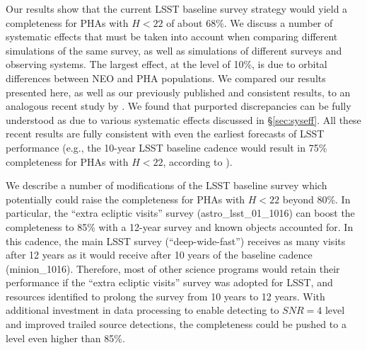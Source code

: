 Our results show that the current LSST baseline survey strategy would yield a completeness for PHAs
with $H<22$ of about 68\%. We discuss a number of systematic effects that must be taken into
account when comparing different simulations of the same survey, as well as simulations of different
surveys and observing systems. The largest effect, at the level of 10\%, is due to orbital differences
between NEO and PHA populations. We compared our results presented here, as well as our previously
published and consistent results, to an analogous recent study by \citet[]{GMS2016}. We found that
purported discrepancies can be fully understood as due to various systematic effects discussed in
\S\ref{sec:syseff}. All these recent results are fully consistent with even the earliest forecasts of LSST
performance (e.g., the 10-year LSST baseline cadence would result in 75\% completeness for PHAs
with $H<22$, according to \citealt{IvezicNEO2007}).

We describe a number of modifications of the LSST baseline survey which potentially could raise the
completeness for PHAs with $H<22$ beyond 80\%. In particular, the ``extra ecliptic visits'' survey
(astro\_lsst\_01\_1016) can boost the completeness to 85\% with a 12-year survey and known objects
accounted for. In this cadence, the main LSST survey (``deep-wide-fast'')
receives as many visits after 12 years as it would receive after 10 years of the
baseline cadence (minion\_1016). Therefore, most of other science programs would
retain their performance if the ``extra ecliptic visits'' survey was adopted for
LSST, and resources identified to prolong the survey from 10 years to 12 years. With additional 
investment in data processing to enable detecting to $SNR=4$ level and improved trailed source detections, 
the completeness could be pushed to a level even higher than 85\%. 
